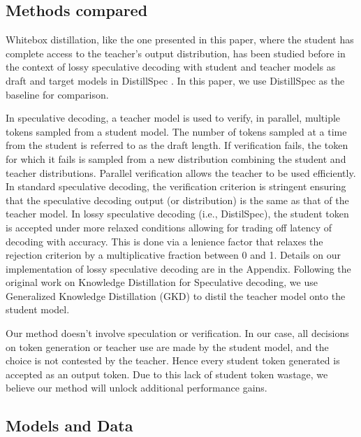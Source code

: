 \subsection{Methods compared}

Whitebox distillation, like the one presented in this paper, where the student has complete access to the teacher's output distribution, has been studied before in the context of lossy speculative decoding with student and teacher models as draft and target models in DistillSpec \cite{DistllSpec}. In this paper, we use DistillSpec as the baseline for comparison.

In speculative decoding, a teacher model is used to verify, in parallel, multiple tokens sampled from a student model. The number of tokens sampled at a time from the student is referred to as the draft length. If verification fails, the token for which it fails is sampled from a new distribution combining the student and teacher distributions. Parallel verification allows the teacher to be used efficiently. In standard speculative decoding, the verification criterion is stringent ensuring that the speculative decoding output (or distribution) is the same as that of the teacher model. In lossy speculative decoding (i.e., DistilSpec), the student token is accepted under more relaxed conditions allowing for trading off latency of decoding with accuracy. This is done via a lenience factor that relaxes the rejection criterion by a multiplicative fraction between 0 and 1. Details on our implementation of lossy speculative decoding are in the Appendix. Following the original work on Knowledge Distillation for Speculative decoding, we use Generalized Knowledge Distillation (GKD) \cite{agarwal2023gkd} to distil the teacher model onto the student model.

Our method doesn't involve speculation or verification. In our case, all decisions on token generation or teacher use are made by the student model, and the choice is not contested by the teacher. Hence every student token generated is accepted as an output token. Due to this lack of student token wastage, we believe our method will unlock additional performance gains.

\subsection{Models and Data}

